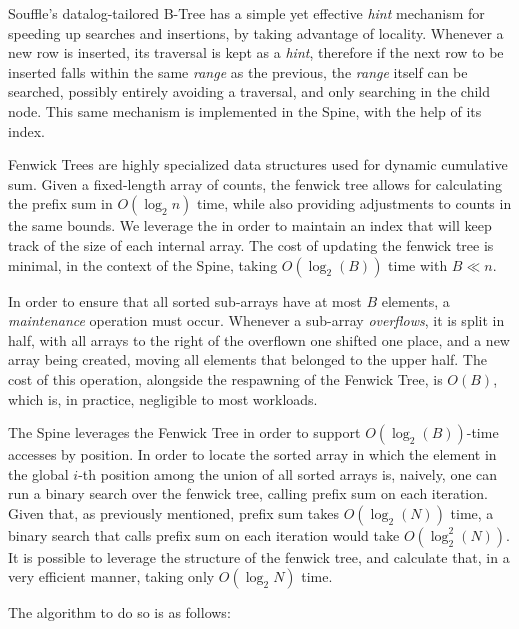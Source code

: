 \documentclass[manuscript,screen,review]{acmart}
\theoremstyle{definition}
\begin{document}
Souffle's datalog-tailored B-Tree\cite{souffle_btree} has a simple yet effective \textit{hint} mechanism for speeding up searches and insertions, by
taking advantage of locality. Whenever a new row is inserted, its traversal is kept as a \textit{hint}, therefore if the next row to be inserted
falls within the same \textit{range} as the previous, the \textit{range} itself can be searched, possibly entirely avoiding a traversal, and only
searching in the child node. This same mechanism is implemented in the Spine, with the help of its index.

Fenwick Trees\cite{fenwick_tree} are highly specialized data structures used for dynamic cumulative sum. Given a fixed-length array of counts, the
fenwick tree allows for calculating the prefix sum in $O(\log_2{n})$ time, while also providing adjustments to counts in the same bounds. We
leverage the \cite{fenwick_tree} in order to maintain an index that will keep track of the size of each internal array. The cost of updating
the fenwick tree is minimal, in the context of the Spine, taking $O(\log_2(B))$ time with $B \ll n$.

In order to ensure that all sorted sub-arrays have at most $B$ elements, a \textit{maintenance} operation must occur. Whenever a sub-array \textit{overflows},
it is split in half, with all arrays to the right of the overflown one shifted one place, and a new array being created, moving all elements that belonged
to the upper half. The cost of this operation, alongside the respawning of the Fenwick Tree, is $O(B)$, which is, in practice, negligible to most
workloads.

The Spine leverages the Fenwick Tree in order to support $O(\log_2(B))$-time accesses by position. In order to locate the sorted array in which the element
in the global $i$-th position among the union of all sorted arrays is, naively, one can run a binary search over the fenwick tree, calling prefix sum on
each iteration. Given that, as previously mentioned, prefix sum takes $O(\log_2(N))$ time, a binary search that calls prefix sum on each iteration would
take $O(\log^2_2(N))$. It is possible to leverage the structure of the fenwick tree, and calculate that, in a very efficient manner, taking only $O(\log_2{N})$ time.

The algorithm to do so is as follows:
\end{document}
